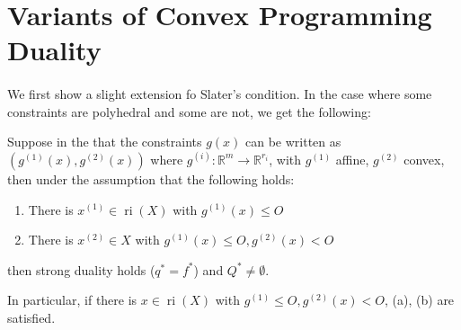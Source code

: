 \section{Variants of Convex Programming Duality}
\label{sect:044}

\paragraph{}We first show a slight extension fo Slater's condition. In the case where some constraints are polyhedral and some are not, we get the following:

\begin{coro}\label{coro:044-slater-combined}
	Suppose in the  that the constraints $g(x)$ can be written as $(g^{(1)}(x),g^{(2)}(x))$ where $g^{(i)}:\mathbb{R}^m\to \mathbb{R}^{r_i}$, with $g^{(1)}$ affine, $g^{(2)}$ convex, then under the assumption that the following holds:
	\begin{enumerate}[label=(\alph*)]
		\item There is $x^{(1)}\in \operatorname{ri}(X)$ with $g^{(1)}(x)\leq O$
		\item There is $x^{(2)}\in X$ with $g^{(1)}(x)\leq O,g^{(2)}(x)<O$
	\end{enumerate}
	then strong duality holds ($q^\ast=f^\ast$) and $Q^\ast\neq\emptyset$.
\end{coro}
In particular, if there is $x\in \operatorname{ri}(X)$ with $g^{(1)}\leq O,g^{(2)}(x)< O$, (a), (b) are satisfied.

